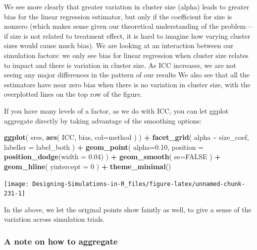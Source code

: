 \documentclass[
]{book}
\newenvironment{Shaded}{\begin{snugshade}}{\end{snugshade}}
\newcommand{\AttributeTok}[1]{\textcolor[rgb]{0.13,0.29,0.53}{#1}}
\newcommand{\ConstantTok}[1]{\textcolor[rgb]{0.56,0.35,0.01}{#1}}
\newcommand{\DecValTok}[1]{\textcolor[rgb]{0.00,0.00,0.81}{#1}}
\newcommand{\FloatTok}[1]{\textcolor[rgb]{0.00,0.00,0.81}{#1}}
\newcommand{\FunctionTok}[1]{\textcolor[rgb]{0.13,0.29,0.53}{\textbf{#1}}}
\newcommand{\NormalTok}[1]{#1}
\newcommand{\SpecialCharTok}[1]{\textcolor[rgb]{0.81,0.36,0.00}{\textbf{#1}}}
\begin{document}
We see more clearly that greater variation in cluster size (alpha) leads to greater bias for the linear regression estimator, but only if the coefficient for size is nonzero (which makes sense given our theoretical understanding of the problem---if size is not related to treatment effect, it is hard to imagine how varying cluster sizes would cause much bias).
We are looking at an interaction between our simulation factors: we only see bias for linear regression when cluster size relates to impact and there is variation in cluster size.
As ICC increases, we are not seeing any major differences in the pattern of our results
We also see that all the estimators have near zero bias when there is no variation in cluster size, with the overplotted lines on the top row of the figure.

If you have many levels of a factor, as we do with ICC, you can let ggplot aggregate directly by taking advantage of the smoothing options:

\begin{Shaded}
\begin{Highlighting}[]
\FunctionTok{ggplot}\NormalTok{( sres, }\FunctionTok{aes}\NormalTok{( ICC, bias, }\AttributeTok{col=}\NormalTok{method ) ) }\SpecialCharTok{+}
  \FunctionTok{facet\_grid}\NormalTok{( alpha }\SpecialCharTok{\textasciitilde{}}\NormalTok{  size\_coef, }\AttributeTok{labeller =}\NormalTok{ label\_both ) }\SpecialCharTok{+}
  \FunctionTok{geom\_point}\NormalTok{( }\AttributeTok{alpha=}\FloatTok{0.10}\NormalTok{,}
              \AttributeTok{position =} \FunctionTok{position\_dodge}\NormalTok{(}\AttributeTok{width =} \FloatTok{0.04}\NormalTok{) ) }\SpecialCharTok{+}
  \FunctionTok{geom\_smooth}\NormalTok{( }\AttributeTok{se=}\ConstantTok{FALSE}\NormalTok{ ) }\SpecialCharTok{+} 
  \FunctionTok{geom\_hline}\NormalTok{( }\AttributeTok{yintercept =} \DecValTok{0}\NormalTok{ ) }\SpecialCharTok{+}
  \FunctionTok{theme\_minimal}\NormalTok{()}
\end{Highlighting}
\end{Shaded}

\begin{center}\texttt{[image: Designing-Simulations-in-R\_files/figure-latex/unnamed-chunk-231-1]} \end{center}

In the above, we let the original points show faintly as well, to give a sense of the variation across simulation trials.

\subsubsection{A note on how to aggregate}\label{a-note-on-how-to-aggregate}
\end{document}
